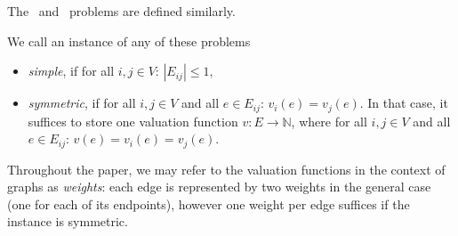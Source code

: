 \documentclass[11pt,letterpaper]{article}
\begin{document}
The \EFXo\ and \EFXmc\ problems are defined similarly.

We call an instance of any of these problems
\begin{itemize}
    \item \emph{simple}, if for all $i,j \in V$: $|E_{ij}|\leq 1$,
    \item \emph{symmetric}, if for all $i,j \in V$ and all $e\in E_{ij}$: $v_i(e)=v_j(e)$. In that case, it suffices to store one valuation function $v \colon E \to \mathbb{N}$, where for all $i,j \in V$ and all $e\in E_{ij}$: $v(e)=v_i(e)=v_j(e)$.
\end{itemize}

Throughout the paper, we may refer to the valuation functions in the context of graphs as \emph{weights}: each edge is represented by two weights in the general case (one for each of its endpoints), however one weight per edge suffices if the instance is symmetric.
\end{document}
